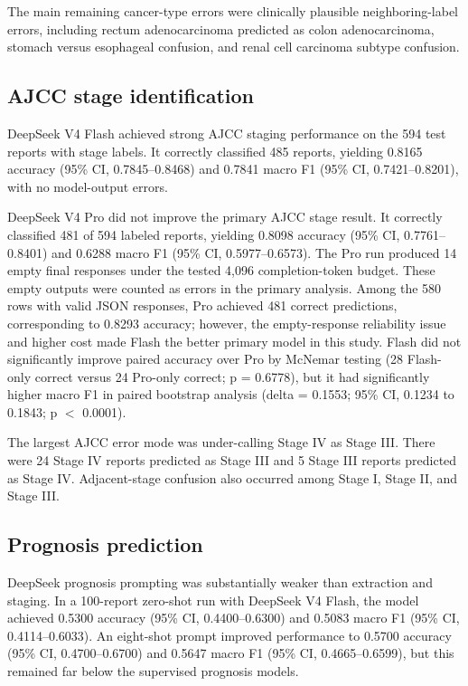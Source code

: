 \documentclass[pdflatex,sn-vancouver-num]{sn-jnl}
\begin{document}
The main remaining cancer-type errors were clinically plausible neighboring-label errors, including rectum adenocarcinoma predicted as colon adenocarcinoma, stomach versus esophageal confusion, and renal cell carcinoma subtype confusion.

\subsection{AJCC stage identification}\label{subsec:stageresults}

DeepSeek V4 Flash achieved strong AJCC staging performance on the 594 test reports with stage labels. It correctly classified 485 reports, yielding 0.8165 accuracy (95\% CI, 0.7845--0.8468) and 0.7841 macro F1 (95\% CI, 0.7421--0.8201), with no model-output errors.

DeepSeek V4 Pro did not improve the primary AJCC stage result. It correctly classified 481 of 594 labeled reports, yielding 0.8098 accuracy (95\% CI, 0.7761--0.8401) and 0.6288 macro F1 (95\% CI, 0.5977--0.6573). The Pro run produced 14 empty final responses under the tested 4,096 completion-token budget. These empty outputs were counted as errors in the primary analysis. Among the 580 rows with valid JSON responses, Pro achieved 481 correct predictions, corresponding to 0.8293 accuracy; however, the empty-response reliability issue and higher cost made Flash the better primary model in this study. Flash did not significantly improve paired accuracy over Pro by McNemar testing (28 Flash-only correct versus 24 Pro-only correct; p = 0.6778), but it had significantly higher macro F1 in paired bootstrap analysis (delta = 0.1553; 95\% CI, 0.1234 to 0.1843; p $<$ 0.0001).

The largest AJCC error mode was under-calling Stage IV as Stage III. There were 24 Stage IV reports predicted as Stage III and 5 Stage III reports predicted as Stage IV. Adjacent-stage confusion also occurred among Stage I, Stage II, and Stage III.

\subsection{Prognosis prediction}\label{subsec:prognosisresults}

DeepSeek prognosis prompting was substantially weaker than extraction and staging. In a 100-report zero-shot run with DeepSeek V4 Flash, the model achieved 0.5300 accuracy (95\% CI, 0.4400--0.6300) and 0.5083 macro F1 (95\% CI, 0.4114--0.6033). An eight-shot prompt improved performance to 0.5700 accuracy (95\% CI, 0.4700--0.6700) and 0.5647 macro F1 (95\% CI, 0.4665--0.6599), but this remained far below the supervised prognosis models.
\end{document}
